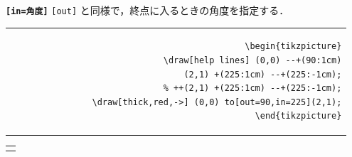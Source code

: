 \documentclass[lualatex]{jlreq}
\begin{document}
\textbf{\texttt{[in=角度]}} \verb|[out]| と同様で，終点に入るときの角度を指定する．
\\[0.5em]
\begin{minipage}{0.62 \textwidth}
    \begin{flushright}
        \begin{tabular}{r}
            \begin{lstlisting}[language={[LaTeX] TeX},
            numbers=none,breaklines=true,gobble=12,frame=none]
            \begin{tikzpicture}
                \draw[help lines] (0,0) --+(90:1cm)
                    (2,1) +(225:1cm) --+(225:-1cm);
                    % ++(2,1) +(225:1cm) --+(225:-1cm);
                \draw[thick,red,->] (0,0) to[out=90,in=225](2,1);
            \end{tikzpicture}
            \end{lstlisting}
        \end{tabular}
    \end{flushright}
\end{minipage}
\hfill
\begin{minipage}{0.32 \textwidth}
    \begin{flushleft}
        \begin{tabular}{l}
            \begin{tikzpicture}
                \draw[help lines] (0,0) --+(90:1cm)
                (2,1) +(225:1cm) --+(225:-1cm);
                \draw[thick,red,->] (0,0) to[out=90,in=225](2,1);
            \end{tikzpicture}
        \end{tabular}
    \end{flushleft}
\end{minipage}
\\[1em]
\end{document}
